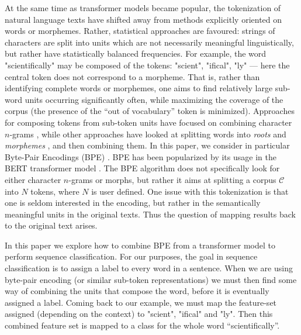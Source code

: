 \documentclass[11pt]{article}
\newcommand\citep{\cite}
\begin{document}
    	At the same time as transformer models became popular, the
     tokenization of natural language texts have shifted away from
     methods explicitly oriented on words or morphemes. Rather,
     statistical approaches are favoured: strings of
     characters are split into units which are not necessarily meaningful
     linguistically, but rather have statistically balanced
     frequencies. For example, the word "scientifically" may be
     composed of the tokens: "scient", "ifical", "ly" --- here the
     central token does not correspond to a morpheme.
             That is, rather than identifying complete words or
     morphemes, one aims to find relatively large sub-word units
     occurring significantly often, while maximizing the coverage of
     the corpus (the presence of the ``out of vocabulary'' token is
     minimized). Approaches for composing tokens from sub-token units
     have focused on combining character $n$-grams
     \citep{bojanowski2017enriching}, while other approaches have
     looked at splitting words into \textit{roots} and
     \textit{morphemes}
     \citep{el2012orthographic,chaudhary2018adapting,xu2017implicitly},
     and then combining them. In this paper, we consider in particular
     Byte-Pair Encodings (BPE) \citep{sennrich2015neural}.
     BPE has been popularized by its usage in the BERT transformer model \citep{devlin2018bert}.
     The BPE algorithm does not specifically look for either
     character $n$-grams or morphs, but rather it aims at splitting a
     corpus $\mathcal{C}$ into $N$ tokens, where $N$ is user defined.
      One issue with this tokenization is that one is seldom
     interested in the encoding, but rather in the semantically
     meaningful units in the original texts. Thus the question of
     mapping results back to the original text arises.

        In this paper we explore how to combine BPE from a transformer
     model to perform sequence classification.  For our purposes, the
     goal in sequence classification is to assign a label to every
     word in a sentence. When we are using byte-pair encoding (or
     similar sub-token representations) we must then find some way of
     combining the units that compose the word, before it is
     eventually assigned a label. Coming back to our example, we must
     map the feature-set assigned (depending on the context) to
     "scient", "ifical" and "ly". Then this combined feature set is
     mapped to a class for the whole word ``scientifically''.
\end{document}
